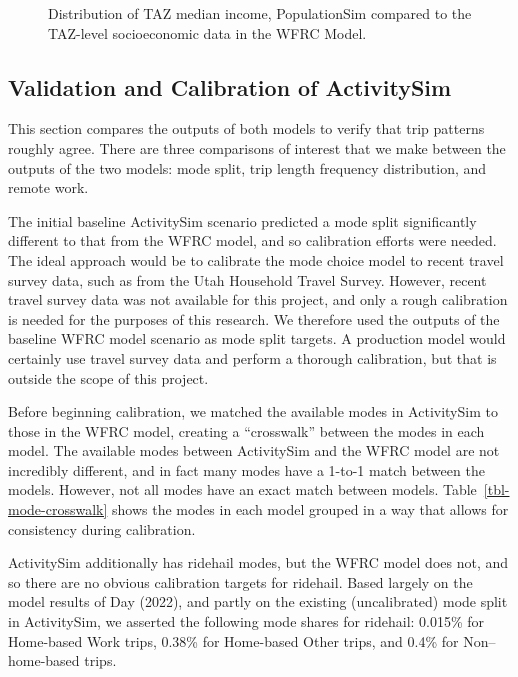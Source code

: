 \documentclass[fancy, oneside, mastersfancy, ms]{byuthesis}
\begin{document}
\begin{figure}


\caption{\label{fig-median-income-density}Distribution of TAZ median
income, PopulationSim compared to the TAZ-level socioeconomic data in
the WFRC Model.}

\end{figure}%

\subsection{Validation and Calibration of
ActivitySim}\label{sec-baseline-calibration}

This section compares the outputs of both models to verify that trip
patterns roughly agree. There are three comparisons of interest that we
make between the outputs of the two models: mode split, trip length
frequency distribution, and remote work.

The initial baseline ActivitySim scenario predicted a mode split
significantly different to that from the WFRC model, and so calibration
efforts were needed. The ideal approach would be to calibrate the mode
choice model to recent travel survey data, such as from the Utah
Household Travel Survey. However, recent travel survey data was not
available for this project, and only a rough calibration is needed for
the purposes of this research. We therefore used the outputs of the
baseline WFRC model scenario as mode split targets. A production model
would certainly use travel survey data and perform a thorough
calibration, but that is outside the scope of this project.

Before beginning calibration, we matched the available modes in
ActivitySim to those in the WFRC model, creating a ``crosswalk'' between
the modes in each model. The available modes between ActivitySim and the
WFRC model are not incredibly different, and in fact many modes have a
1-to-1 match between the models. However, not all modes have an exact
match between models. Table~\ref{tbl-mode-crosswalk} shows the modes in
each model grouped in a way that allows for consistency during
calibration.

ActivitySim additionally has ridehail modes, but the WFRC model does
not, and so there are no obvious calibration targets for ridehail. Based
largely on the model results of Day (2022), and partly on the existing
(uncalibrated) mode split in ActivitySim, we asserted the following mode
shares for ridehail: 0.015\% for Home-based Work trips, 0.38\% for
Home-based Other trips, and 0.4\% for Non--home-based trips.
\end{document}
